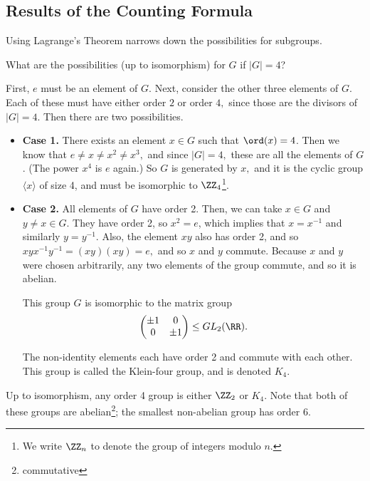 \subsection{Results of the Counting Formula}
Using Lagrange's Theorem narrows down the possibilities for subgroups. 
\begin{example}
What are the possibilities (up to isomorphism) for $G$ if $|G| = 4$?

First, $e$ must be an element of $G$. Next, consider the other three elements of $G$. Each of these must have either order $2$ or order $4,$ since those are the divisors of $|G| = 4.$ Then there are two possibilities. 

\begin{itemize}
    \item \textbf{Case 1.} There exists an element $x \in G$ such that $\ord(x) = 4$. Then we know that $e \neq x \neq x^2 \neq x^3,$ and since $|G| = 4,$ these are all the elements of $G$. (The power $x^4$ is $e$ again.) So $G$ is generated by $x,$ and it is the cyclic group $\langle x \rangle$ of size 4, and must be isomorphic to $\ZZ_4$\footnote{We write $\ZZ_n$ to denote the group of integers modulo $n$.}.
    
    \item \textbf{Case 2.} All elements of $G$ have order 2. Then, we can take $x \in G$ and $y \neq x \in G.$ They have order 2, so $x^2 = e$, which implies that $x = x^{-1}$ and similarly $y = y^{-1}.$ Also, the element $xy$ also has order 2, and so $xyx^{-1}y^{-1} = (xy)(xy) = e,$ and so $x$ and $y$ commute. Because $x$ and $y$ were chosen arbitrarily, any two elements of the group commute, and so it is abelian. 

    This group $G$ is isomorphic to the matrix group
    \[
    \begin{pmatrix}
    \pm 1 & 0 \\
    0 & \pm 1
    \end{pmatrix} 
    \leq GL_2(\RR).
    \]
    
    The non-identity elements each have order 2 and commute with each other. This group is called the Klein-four group, and is denoted $K_4.$
\end{itemize}

Up to isomorphism, any order 4 group is either $\ZZ_2$ or $K_4.$ Note that both of these groups are abelian\footnote{commutative}; the smallest non-abelian group has order 6.

\end{example}

